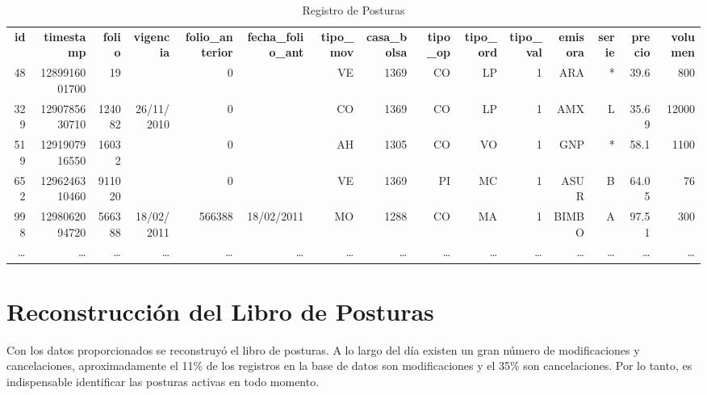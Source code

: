 \documentclass[11pt]{article}
\numberwithin{equation}{section} %
\begin{document}
\begin{landscape}
\begin{table}[htbp]\scriptsize
\centering
\caption{ Registro de Posturas}
\setlength\tabcolsep{1.25pt}
\begin{tabular}{rrrrrrrrrrrrrrr}
\textbf{ id}    & \textbf{timestamp} & \textbf{folio} & \textbf{vigencia} & \textbf{folio\_anterior} & \textbf{fecha\_folio\_ant} & \textbf{tipo\_mov} & \textbf{casa\_bolsa} & \textbf{tipo\_op} & \textbf{tipo\_ord} & \textbf{tipo\_val} & \textbf{emisora} & \textbf{serie} & \textbf{precio} & \textbf{volumen} \\
48 & 1289916001700 & 19    &       & 0     &       & VE    & 1369  & CO    & LP    & 1     & ARA & *     & 39.6  & 800 \\
329 & 1290785630710 & 124082 & 26/11/2010 & 0     &       & CO    & 1369  & CO    & LP    & 1     & AMX   & L     & 35.69 & 12000 \\
519 & 1291907916550 & 16032 &       & 0     &       & AH    & 1305  & CO    & VO    & 1     & GNP & *     & 58.1  & 1100 \\
652 & 1296246310460 & 911020 &       & 0     &       & VE    & 1369  & PI    & MC    & 1     & ASUR  & B     & 64.05 & 76 \\
998 & 1298062094720 & 566388 & 18/02/2011 & 566388 & 18/02/2011 & MO    & 1288  & CO    & MA    & 1     & BIMBO & A     & 97.51 & 300 \\
\ldots & \ldots & \ldots & \ldots & \ldots & \ldots & \ldots & \ldots & \ldots & \ldots & \ldots & \ldots & \ldots & \ldots & \ldots \\
\end{tabular}%
\label{tab:regposturasl}%
\end{table}%

\end{landscape}

\clearpage

\section{Reconstrucción del Libro de Posturas}

Con los datos proporcionados se reconstruyó el libro de posturas. A lo largo del día existen un gran número de modificaciones y cancelaciones, aproximadamente el 11\% de los registros en la base de datos son modificaciones y el 35\% son cancelaciones. Por lo tanto, es indispensable identificar las posturas activas en todo momento.\\
\end{document}
